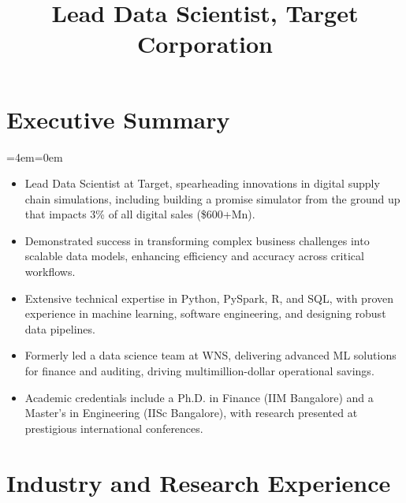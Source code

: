 \documentclass[11pt,a4paper,]{moderncv}
\title{Lead Data Scientist, Target Corporation}
\begin{document}
\makecvtitle

\newenvironment{smallblockquote}{
  \par
  \medskip
  \leftskip=2em\rightskip=0em
  \noindent\ignorespaces
  }{\par\medskip}

\newenvironment{blockquote}{
  \par
  \medskip
  \leftskip=4em\rightskip=0em
  \noindent\ignorespaces
  }{\par\medskip}

\hypertarget{executive-summary}{
\section{Executive Summary}\label{executive-summary}}

\begingroup
  \par
  \medskip
  \leftskip=4em\rightskip=0em
  \noindent\ignorespaces

\begin{itemize}
    \item Lead Data Scientist at Target, spearheading innovations in digital supply chain simulations, including building a promise simulator from the ground up that impacts 3\% of all digital sales (\$600+Mn).
    \item Demonstrated success in transforming complex business challenges into scalable data models, enhancing efficiency and accuracy across critical workflows.
    \item Extensive technical expertise in Python, PySpark, R, and SQL, with proven experience in machine learning, software engineering, and designing robust data pipelines.
    \item Formerly led a data science team at WNS, delivering advanced ML solutions for finance and auditing, driving multimillion-dollar operational savings.
    \item Academic credentials include a Ph.D. in Finance (IIM Bangalore) and a Master's in Engineering (IISc Bangalore), with research presented at prestigious international conferences.
\end{itemize}

  \par\medskip
\endgroup

\hypertarget{industry-and-research-experience}{
\section{Industry and Research
Experience}\label{industry-and-research-experience}}
\end{document}
